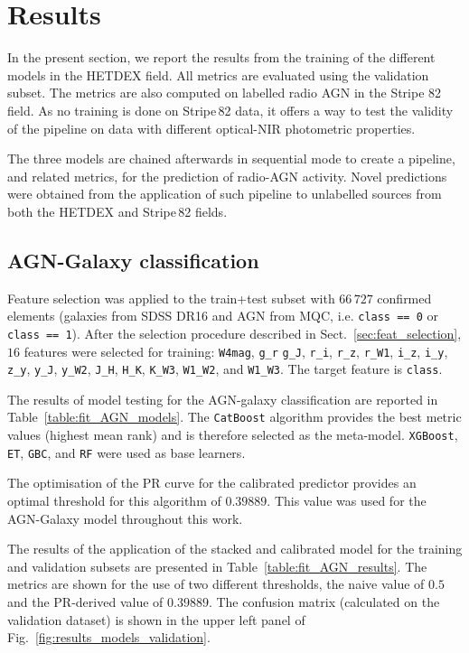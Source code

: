 \documentclass{aa}
\begin{document}
\section{Results}\label{sec:results}
In the present section, we report the results from the training of the different models in the HETDEX field. All metrics are evaluated using the validation subset. The metrics are also computed on labelled radio AGN in the Stripe 82 field. As no training is done on Stripe\,82 data, it offers a way to test the validity of the pipeline on data with different optical-NIR photometric properties.

The three models are chained afterwards in sequential mode to create a pipeline, and related metrics, for the prediction of radio-AGN activity. Novel predictions were obtained from the application of such pipeline to unlabelled sources from both the HETDEX and Stripe\,82 fields. 

\subsection{AGN-Galaxy classification}\label{sec:results_agn}
Feature selection was applied to the train+test subset with $66\,727$ confirmed elements (galaxies from SDSS DR16 and AGN from MQC, i.e. \texttt{class == 0} or \texttt{class == 1}). After the selection procedure described in Sect.~\ref{sec:feat_selection}, $16$ features were selected for training: \verb|W4mag|, \verb|g_r| \verb|g_J|, \verb|r_i|, \verb|r_z|, \verb|r_W1|, \verb|i_z|, \verb|i_y|, \verb|z_y|, \verb|y_J|, \verb|y_W2|, \verb|J_H|, \verb|H_K|, \verb|K_W3|, \verb|W1_W2|, and \verb|W1_W3|. The target feature is \verb|class|.

The results of model testing for the AGN-galaxy classification are reported in Table~\ref{table:fit_AGN_models}. The \verb|CatBoost| algorithm provides the best metric values (highest mean rank) and is therefore selected as the  meta-model. \verb|XGBoost|, \verb|ET|, \verb|GBC|, and \verb|RF| were used as base learners.

The optimisation of the PR curve for the calibrated predictor provides an optimal threshold for this algorithm of $0.39889$. This value was used for the AGN-Galaxy model throughout this work.

The results of the application of the stacked and calibrated model for the training and validation subsets are presented in Table~\ref{table:fit_AGN_results}. The metrics are shown for the use of two different thresholds, the naive value of $0.5$ and the  PR-derived value of $0.39889$. The confusion matrix (calculated on the validation dataset) is shown in the upper left panel of Fig.~\ref{fig:results_models_validation}. 
\end{document}
